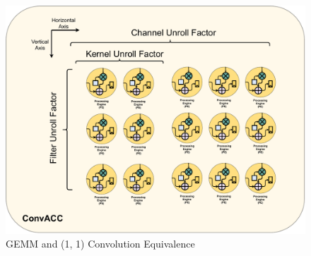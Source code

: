 \begin{figure}[]
    \centering
    \includegraphics[scale=0.4]{fig/axis_mapping.pdf}
    \caption{\ac{GEMM} and (1, 1) Convolution Equivalence}
    \label{fig:axis_mapping}
\end{figure}

